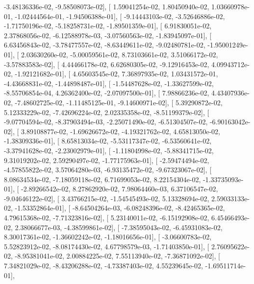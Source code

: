 \documentclass{article}
\begin{document}
         -3.48136336e-02,  -9.58508073e-02],
       [  1.59041254e-02,   1.80450940e-02,   1.03660978e-01,
         -1.02444564e-01,  -1.94506388e-01],
       [ -9.14443103e-02,  -3.52646886e-02,  -1.71750196e-02,
         -5.18258731e-02,  -1.89501359e-01],
       [  6.91830051e-02,   2.37868056e-02,  -6.12588978e-03,
         -3.07560563e-02,  -1.83945097e-01],
       [  6.63456843e-02,  -3.78477557e-02,  -8.63449611e-02,
         -9.02480781e-02,  -1.95001249e-01],
       [  2.03630260e-02,  -5.00059561e-02,   8.73103661e-02,
          3.51066172e-02,  -3.57883583e-02],
       [  4.44466178e-02,   6.62680305e-02,  -9.12916453e-02,
          4.09943712e-02,  -1.92121682e-01],
       [  4.65603545e-02,   7.36897935e-02,   1.03431572e-01,
         -4.43668831e-02,  -1.44898487e-01],
       [ -1.54487628e-02,  -1.33627599e-02,  -8.55706854e-04,
          4.26362400e-02,  -2.07097500e-01],
       [  7.98866236e-02,   4.43407936e-02,  -7.48602725e-02,
         -1.11485125e-01,  -9.14600971e-02],
       [  5.39290872e-02,   5.12333229e-02,  -7.42696224e-02,
          2.02335358e-02,  -8.51199379e-02],
       [ -9.07704594e-02,  -8.37903494e-03,  -2.25071490e-02,
         -6.51304507e-02,  -6.90163042e-02],
       [  3.89108877e-02,  -1.69626672e-02,  -4.19321762e-02,
          4.65813050e-02,  -1.38309336e-01],
       [  8.65813034e-02,  -5.53117347e-02,  -6.53560641e-02,
         -3.37941628e-02,  -2.23002979e-01],
       [ -1.11804998e-02,  -5.88341715e-02,   9.31019202e-02,
          2.59290497e-02,  -1.77175963e-01],
       [ -2.59474494e-02,  -4.57855822e-02,   3.57064280e-03,
         -6.93135472e-02,  -9.67323067e-02],
       [  8.08634534e-02,  -7.18059118e-02,   6.71699053e-02,
          8.22154304e-02,  -1.33735093e-01],
       [ -2.89266542e-02,   8.27862920e-02,   7.98064460e-03,
          6.37106547e-02,  -9.04646122e-02],
       [  3.43766215e-02,  -1.54545493e-02,   5.13328694e-02,
          2.59033133e-02,  -1.53352864e-01],
       [ -8.64504264e-03,  -6.08248396e-02,  -8.42465365e-02,
          4.79615368e-02,  -7.71323816e-02],
       [  5.23140011e-02,  -6.15192908e-02,   6.45466493e-02,
          2.38066677e-03,  -4.38599861e-02],
       [ -7.38595043e-02,  -6.45931083e-02,   8.30017361e-02,
         -1.36602242e-02,  -1.18016656e-01],
       [ -3.06600783e-02,   5.52823912e-02,  -8.08174430e-02,
          4.67798579e-03,  -1.71403850e-01],
       [  2.76095622e-02,  -8.95381041e-02,   2.00884225e-02,
          7.55113940e-02,  -7.36871092e-02],
       [  7.34821029e-02,  -8.43206288e-02,  -4.73387403e-02,
          4.55239645e-02,  -1.69511714e-01],
\end{document}
